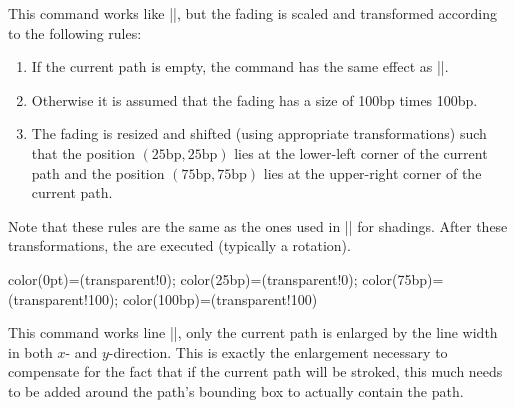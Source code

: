 \begin{command}{\pgfsetfadingforcurrentpath{}}
  This command works like |\pgfsetfading|, but the fading is scaled
  and transformed according to the following rules:
  \begin{enumerate}
  \item
    If the current path is empty, the command has the same effect as
    |\pgfsetfading|.
  \item
    Otherwise it is assumed that the fading has a size of 100bp times
    100bp.
  \item
    The fading is resized and shifted (using appropriate
    transformations) such that the position
    $(25\mathrm{bp},25\mathrm{bp})$ lies at the lower-left corner of
    the current path and the position $(75\mathrm{bp},75\mathrm{bp})$
    lies at the upper-right corner of the current path.
  \end{enumerate}
  Note that these rules are the same as the ones used in
  |\pgfshadepath| for shadings. After these transformations, the
   are executed (typically a rotation).
\begin{codeexample}[]
{ color(0pt)=(transparent!0);    color(25bp)=(transparent!0);
  color(75bp)=(transparent!100); color(100bp)=(transparent!100)}


\end{codeexample}

\end{command}

\begin{command}{\pgfsetfadingforcurrentpathstroked{}}
  This command works line |\pgfsetfadingforcurrentpath|, only the
  current path is enlarged by the line width in both $x$- and
  $y$-direction. This is exactly the enlargement necessary to
  compensate for the fact that if the current path will be stroked,
  this much needs to be added around the path's bounding box to
  actually contain the path.
\begin{codeexample}[]
\end{codeexample}
\end{command}

